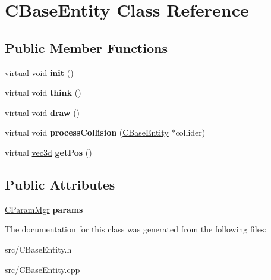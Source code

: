 \hypertarget{class_c_base_entity}{
\section{CBaseEntity Class Reference}
\label{class_c_base_entity}
}
\subsection*{Public Member Functions}
\begin{DoxyCompactItemize}
\item 
\hypertarget{class_c_base_entity_ac48b4dc380ceebcc66d4243227732430}{
virtual void {\bfseries init} ()}
\label{class_c_base_entity_ac48b4dc380ceebcc66d4243227732430}

\item 
\hypertarget{class_c_base_entity_acdf031fbf15e1afb0d5365a14f4cae34}{
virtual void {\bfseries think} ()}
\label{class_c_base_entity_acdf031fbf15e1afb0d5365a14f4cae34}

\item 
\hypertarget{class_c_base_entity_a9877f7539c282bfe7ee02a6cd29382e9}{
virtual void {\bfseries draw} ()}
\label{class_c_base_entity_a9877f7539c282bfe7ee02a6cd29382e9}

\item 
\hypertarget{class_c_base_entity_aef5bc8ccedc1b36e2fbcd7fcb0361175}{
virtual void {\bfseries processCollision} (\hyperlink{class_c_base_entity}{CBaseEntity} $\ast$collider)}
\label{class_c_base_entity_aef5bc8ccedc1b36e2fbcd7fcb0361175}

\item 
\hypertarget{class_c_base_entity_a0557e8188cb9529da164d5ae0e63c41c}{
virtual \hyperlink{classvec3d}{vec3d} {\bfseries getPos} ()}
\label{class_c_base_entity_a0557e8188cb9529da164d5ae0e63c41c}

\end{DoxyCompactItemize}
\subsection*{Public Attributes}
\begin{DoxyCompactItemize}
\item 
\hypertarget{class_c_base_entity_acc7a3833bb1ed7064713d52ce70e3119}{
\hyperlink{class_c_param_mgr}{CParamMgr} {\bfseries params}}
\label{class_c_base_entity_acc7a3833bb1ed7064713d52ce70e3119}

\end{DoxyCompactItemize}


The documentation for this class was generated from the following files:\begin{DoxyCompactItemize}
\item 
src/CBaseEntity.h\item 
src/CBaseEntity.cpp\end{DoxyCompactItemize}
